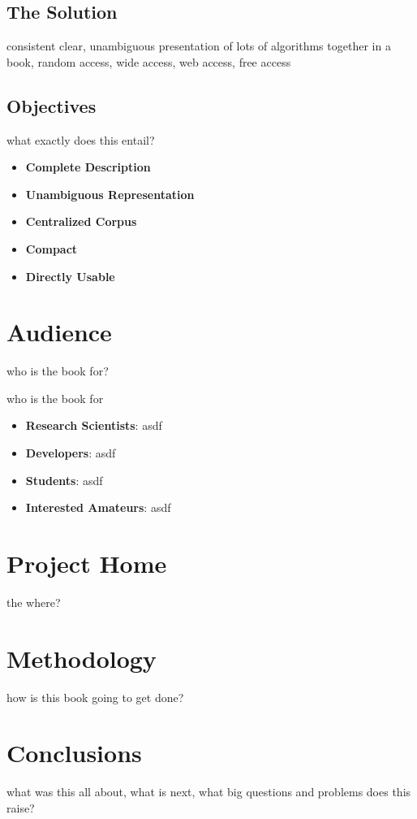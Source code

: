 \documentclass[a4paper, 11pt]{article}
\begin{document}
\subsection{The Solution}
consistent clear, unambiguous presentation of lots of algorithms together
in a book, random access, wide access, web access, free access

\subsection{Objectives}

what exactly does this entail?

\begin{itemize}
	\item \textbf{Complete Description}
	\item \textbf{Unambiguous Representation}
	\item \textbf{Centralized Corpus}
	\item \textbf{Compact}
	\item \textbf{Directly Usable}
\end{itemize}

\section{Audience}
\label{sec:audience}
who is the book for?

who is the book for 

\begin{itemize}
	\item \textbf{Research Scientists}: asdf
	\item \textbf{Developers}: asdf
	\item \textbf{Students}: asdf
	\item \textbf{Interested Amateurs}: asdf
\end{itemize}


\section{Project Home}
the where?

\section{Methodology}
\label{sec:methodology}
how is this book going to get done?


\section{Conclusions}
\label{sec:conclusions}
what was this all about, what is next, what big questions and problems does this raise?
\end{document}
